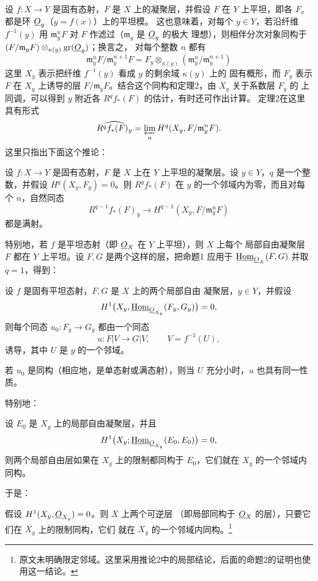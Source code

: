 设 $f:X\longrightarrow Y$ 是固有态射，$F$ 是 $X$ 上的凝聚层，并假设
$F$ 在 $Y$ 上平坦，即各 $F_x$ 都是环 $\underline{O}_y$（$y=f(x)$）上的平坦模。
这也意味着，对每个 $y\in Y$，若沿纤维 $f^{-1}(y)$ 用
$\mathfrak m_y^nF$ 对 $F$ 作滤过（$\mathfrak m_y$ 是 $\underline{O}_y$ 的极大
理想），则相伴分次对象同构于
$(F/\mathfrak m_yF)\otimes_{\kappa(y)}\operatorname{gr}(\underline{O}_y)$；换言之，
对每个整数 $n$ 都有
\[
  \mathfrak m_y^nF/\mathfrak m_y^{n+1}F
  =F_y\otimes_{\kappa(y)}
  (\mathfrak m_y^n/\mathfrak m_y^{n+1})
\]
这里 $X_y$ 表示把纤维 $f^{-1}(y)$ 看成 $y$ 的剩余域 $\kappa(y)$ 上的
固有概形，而 $F_y$ 表示 $F$ 在 $X_y$ 上诱导的层
$F/\mathfrak m_yF$。结合这个同构和定理2，由 $X_y$ 关于系数层 $F_y$ 的
上同调，可以得到 $y$ 附近各 $R^qf_*(F)$ 的估计，有时还可作出计算。
定理2在这里具有形式
\[
  \widehat{R^qf_*(F)_y}
  =\varprojlim_n H^q(X_y,F/\mathfrak m_y^nF).
\]
这里只指出下面这个推论：

 设 $f:X\longrightarrow Y$ 是固有态射，$F$ 是 $X$ 上在
$Y$ 上平坦的凝聚层。设 $y\in Y$，$q$ 是一个整数，并假设
$H^q(X_y,F_y)=0$。则 $R^qf_*(F)$ 在 $y$ 的一个邻域内为零，而且对每个
$n$，自然同态
\[
  R^{q-1}f_*(F)_y\longrightarrow
  H^{q-1}(X_y,F/\mathfrak m_y^nF)
\]
都是满射。

特别地，若 $f$ 是平坦态射（即 $\underline{O}_X$ 在 $Y$ 上平坦），则 $X$ 上每个
局部自由凝聚层 $F$ 都在 $Y$ 上平坦。设 $F,G$ 是两个这样的层，把命题1
应用于 $\underline{\operatorname{Hom}}_{\underline{O}_X}(F,G)$ 并取 $q=1$，得到：

 设 $f$ 是固有平坦态射，$F,G$ 是 $X$ 上的两个局部自由
凝聚层，$y\in Y$，并假设
\[
  H^1\bigl(X_y,\underline{\operatorname{Hom}}_{\underline{O}_{X_y}}(F_y,G_y)\bigr)=0,
\]
则每个同态 $u_0:F_y\longrightarrow G_y$ 都由一个同态
\[
  u:F|V\longrightarrow G|V,
  \qquad V=f^{-1}(U),
\]
诱导，其中 $U$ 是 $y$ 的一个邻域。

 若 $u_0$ 是同构（相应地，是单态射或满态射），则当 $U$
充分小时，$u$ 也具有同一性质。

特别地：

 设 $E_0$ 是 $X_y$ 上的局部自由凝聚层，并且
\[
  H^1\bigl(X_y;\underline{\operatorname{Hom}}_{\underline{O}_{X_y}}(E_0,E_0)\bigr)=0,
\]
则两个局部自由层如果在 $X_y$ 上的限制都同构于 $E_0$，它们就在 $X_y$
的一个邻域内同构。

于是：

 假设 $H^1(X_y,\underline{O}_{X_y})=0$。则 $X$ 上两个可逆层
（即局部同构于 $\underline{O}_X$ 的层），只要它们在 $X_y$ 上的限制同构，它们
就在 $X_y$ 的一个邻域内同构。\footnote{原文未明确限定邻域。这里采用推论2中的局部结论，后面的命题2的证明也使用这一结论。}

